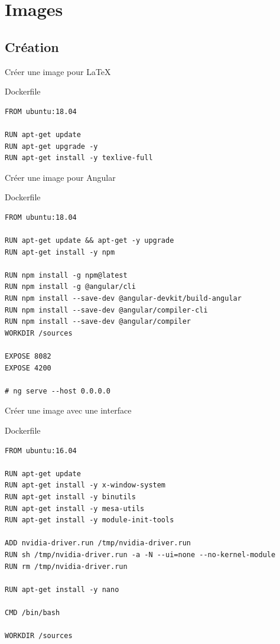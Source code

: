 \documentclass{beamer}
\begin{document}
\section{Images}
\subsection{Création}

\begin{frame}[fragile]{Créer une image pour \LaTeX}
\begin{block}{Dockerfile}
\begin{verbatim}
FROM ubuntu:18.04

RUN apt-get update
RUN apt-get upgrade -y 
RUN apt-get install -y texlive-full
\end{verbatim}
\end{block}
\end{frame}

\begin{frame}[fragile]{Créer une image pour Angular}
\begin{block}{Dockerfile}
\scriptsize
\begin{verbatim}
FROM ubuntu:18.04

RUN apt-get update && apt-get -y upgrade
RUN apt-get install -y npm

RUN npm install -g npm@latest
RUN npm install -g @angular/cli
RUN npm install --save-dev @angular-devkit/build-angular
RUN npm install --save-dev @angular/compiler-cli
RUN npm install --save-dev @angular/compiler
WORKDIR /sources

EXPOSE 8082
EXPOSE 4200

# ng serve --host 0.0.0.0
\end{verbatim}
\end{block}
\end{frame}



\begin{frame}[fragile]{Créer une image avec une interface}
\begin{block}{Dockerfile}
\scriptsize
\begin{verbatim}
FROM ubuntu:16.04

RUN apt-get update
RUN apt-get install -y x-window-system
RUN apt-get install -y binutils
RUN apt-get install -y mesa-utils
RUN apt-get install -y module-init-tools

ADD nvidia-driver.run /tmp/nvidia-driver.run
RUN sh /tmp/nvidia-driver.run -a -N --ui=none --no-kernel-module
RUN rm /tmp/nvidia-driver.run

RUN apt-get install -y nano

CMD /bin/bash

WORKDIR /sources
\end{verbatim}
\end{block}
\end{frame}
\end{document}
